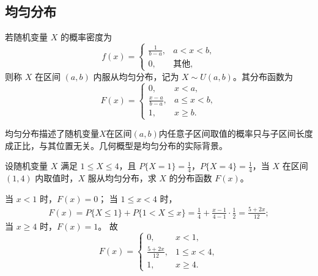 \documentclass[lang=cn,11pt]{elegantbook}
\begin{document}
\subsection{均匀分布} \label{subsec:uniform-dist}
\begin{definition}[均匀分布]\label{def:uniform-dist}
若随机变量 $X$ 的概率密度为
\[
f(x) = \begin{cases}
\frac{1}{b-a}, & a < x < b, \\
0, & \text{其他},
\end{cases}
\]
则称 $X$ 在区间 $(a,b)$ 内服从均匀分布，记为 $X \sim U(a,b)$。其分布函数为
\[
F(x) = \begin{cases}
0, & x < a, \\
\frac{x-a}{b-a}, & a \le x < b, \\
1, & x \ge b.
\end{cases}
\]
\end{definition}

\begin{note}
均匀分布描述了随机变量$X$在区间$(a,b)$内任意子区间取值的概率只与子区间长度成正比，与其位置无关。几何概型是均匀分布的实际背景。
\end{note}

\begin{exercise}\label{exer:2-13}
设随机变量 $X$ 满足 $1 \le X \le 4$，且 $P\{X=1\} = \frac{1}{4}$，$P\{X=4\} = \frac{1}{4}$，当 $X$ 在区间 $(1,4)$ 内取值时，$X$ 服从均匀分布，求 $X$ 的分布函数 $F(x)$。
\end{exercise}
\begin{solution}
当 $x < 1$ 时，$F(x) = 0$；
当 $1 \le x < 4$ 时，
\[
\begin{aligned}
F(x) = P\{X \le 1\} + P\{1 < X \le x\} = \frac{1}{4} + \frac{x-1}{4-1} \cdot \frac{1}{2} = \frac{5 + 2x}{12};
\end{aligned}
\]
当 $x \ge 4$ 时，$F(x) = 1$。
故
\[
F(x) = \begin{cases}
0, & x < 1, \\
\frac{5 + 2x}{12}, & 1 \le x < 4, \\
1, & x \ge 4.
\end{cases}
\]
\end{solution}
\end{document}
